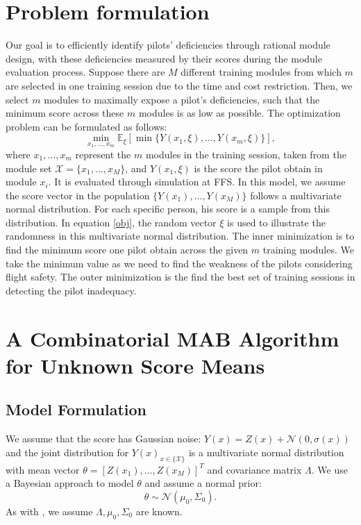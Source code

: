 \documentclass[opre,sglanonrev]{informs4}
\begin{document}
\section{Problem formulation}
\label{problem formulation}
Our goal is to efficiently identify pilots’ deficiencies through rational module design, with these deficiencies measured by their scores during the module evaluation process. Suppose there are $M$ different training modules from which $m$ are selected in one training session due to the time and cost restriction. Then, we select $m$ modules to maximally expose a pilot’s deficiencies, such that the minimum score across these $m$ modules is as low as possible. The optimization problem can be formulated as follows:
\begin{equation}
	\min_{x_1,...,x_m} \mathbb{E}_\xi[\min\{Y(x_1,\xi),...,Y(x_m,\xi) \} ], 
	\label{obj}
\end{equation}
where $x_1,...,x_m$ represent the $m$ modules in the training session, taken from the module set $\mathcal{X} = \{x_1,...,x_M\}$, and $Y(x_1,\xi)$ is the score the pilot obtain in module $x_i$. It is evaluated through simulation at FFS. In this model, we assume the score vector in the population $\{Y(x_1),...,Y(x_M)\}$ follows a multivariate normal distribution. For each specific person, his score is a sample from this distribution. In equation \eqref{obj}, the random vector $\xi$ is used to illustrate the randomness in this multivariate normal distribution. The inner minimization is to find the minimum score one pilot obtain across the given $m$ training modules. We take the minimum value as we need to find the weakness of the pilots considering flight safety. The outer minimization is the find the best set of training sessions in detecting the pilot inadequacy.

\section{A Combinatorial MAB Algorithm for Unknown Score Means}
\label{BCUCB}
\subsection{Model Formulation}
We assume that the score has Gaussian noise: $Y(x) = Z(x) + \mathcal{N}(0,\sigma(x))$ and the joint distribution for $Y(x)_{x\in\{\mathcal{X}\}}$ is a multivariate normal distribution with mean vector $\theta = [Z(x_1),...,Z(x_M)]^T$ and covariance matrix $\Lambda$. We use a Bayesian approach to model $\theta$ and assume a normal prior:
$$\theta \sim \mathcal{N}(\mu_0, \Sigma_0). $$
As with \cite{xie2016bayesian}, we assume $\Lambda, \mu_0, \Sigma_0$ are known.
\end{document}
